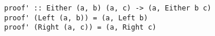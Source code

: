 \documentclass[12pt,twoside]{report}
\begin{document}
\begin{lstlisting}
proof' :: Either (a, b) (a, c) -> (a, Either b c)
proof' (Left (a, b)) = (a, Left b)
proof' (Right (a, c)) = (a, Right c)
\end{lstlisting}

\end{document}
